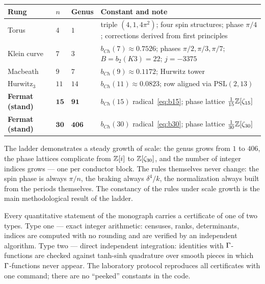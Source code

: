 \begin{center}
\small
\begin{tabularx}{\textwidth}{@{}l l l >{\raggedright\arraybackslash}X@{}}
\toprule
Rung & $n$ & Genus & Constant and note \\
\midrule
Torus & $4$ & $1$ & triple $(4,1,4\pi^2)$; four spin structures;
  phase $\pi/4$; corrections derived from first principles \\
Klein curve & $7$ & $3$ & $b_{Ch}(7)\approx0.7526$; phases
  $\pi/2,\pi/3,\pi/7$; $B=b_2(K3)=22$; $j=-3375$ \\
Macbeath & $9$ & $7$ & $b_{Ch}(9)\approx0.1172$; Hurwitz tower \\
Hurwitz$_3$ & $11$ & $14$ & $b_{Ch}(11)\approx0.0823$; row aligned
  via $\mathrm{PSL}(2,13)$ \\
\textbf{Fermat (stand)} & $\mathbf{15}$ & $\mathbf{91}$ &
  $b_{Ch}(15)$ radical~\eqref{eq:b15}; phase lattice
  $\tfrac1{15}\mathbb{Z}[\zeta_{15}]$ \\
\textbf{Fermat (stand)} & $\mathbf{30}$ & $\mathbf{406}$ &
  $b_{Ch}(30)$ radical~\eqref{eq:b30}; phase lattice
  $\tfrac1{30}\mathbb{Z}[\zeta_{30}]$ \\
\bottomrule
\end{tabularx}
\end{center}

The ladder demonstrates a steady growth of scale: the genus grows
from $1$ to $406$, the phase lattices complicate from $\mathbb{Z}[i]$ to
$\mathbb{Z}[\zeta_{30}]$, and the number of integer indices grows --- one
per conductor block. The rules themselves never change: the spin
phase is always $\pi/n$, the braking always $\delta^4/k$, the
normalization always built from the periods themselves. The
constancy of the rules under scale growth is the main methodological
result of the ladder.

\begin{remark}
Every quantitative statement of the monograph carries a certificate
of one of two types. Type one --- exact integer arithmetic: censuses,
ranks, determinants, indices are computed with no rounding and are
verified by an independent algorithm. Type two --- direct
independent integration: identities with $\Gamma$-functions are checked
against tanh-sinh quadrature over smooth pieces in which
$\Gamma$-functions never appear. The laboratory protocol reproduces all
certificates with one command; there are no ``peeked'' constants in
the code.
\end{remark}

